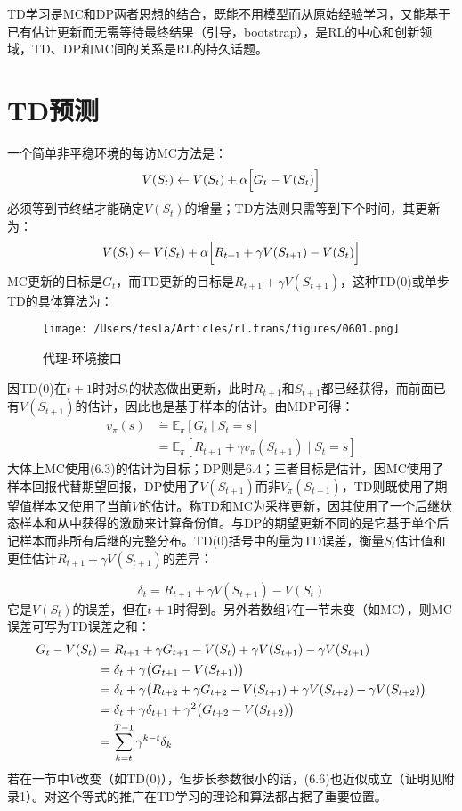 \documentclass{ctexart}
\begin{document}
TD学习是MC和DP两者思想的结合，既能不用模型而从原始经验学习，又能基于已有估计更新而无需等待最终结果（引导，bootstrap），是RL的中心和创新领域，TD、DP和MC间的关系是RL的持久话题。


\section{TD预测}

一个简单非平稳环境的每访MC方法是：
\begin{equation}
V(S_t) \leftarrow V(S_t) + \alpha\Bigl[G_t-V(S_t)\Bigr]
\end{equation}
必须等到节终结才能确定$V(S_t)$的增量；TD方法则只需等到下个时间，其更新为：
\begin{equation}
V(S_t) \leftarrow V(S_t) + \alpha\Bigl[R_{t+1}+\gamma V(S_{t+1})-V(S_t)\Bigr]
\end{equation}
MC更新的目标是$G_t$，而TD更新的目标是$R_{t+1}+\gamma V(S_{t+1})$，这种TD(0)或单步TD的具体算法为：

\begin{figure}[htbp]
    \centering
    \texttt{[image: /Users/tesla/Articles/rl.trans/figures/0601.png]}
    \caption{代理-环境接口}
    \label{fig:0601} 
\end{figure}

因TD(0)在$t+1$时对$S_{t}$的状态做出更新，此时$R_{t+1}$和$S_{t+1}$都已经获得，而前面已有$V(S_{t+1})$的估计，因此也是基于样本的估计。由MDP可得：
\begin{align}
v_\pi(s) &\dot= \mathbb E_\pi[G_t\mid S_t=s] \\
&= \mathbb E_\pi[R_{t+1}+\gamma v_\pi(S_{t+1}) \mid S_t=s]
\end{align}
大体上MC使用(6.3)的估计为目标；DP则是6.4；三者目标是估计，因MC使用了样本回报代替期望回报，DP使用了$V(S_{t+1})$而非$V_\pi(S_{t+1})$，TD则既使用了期望值样本又使用了当前$V$的估计。称TD和MC为采样更新，因其使用了一个后继状态样本和从中获得的激励来计算备份值。与DP的期望更新不同的是它基于单个后记样本而非所有后继的完整分布。TD(0)括号中的量为TD误差，衡量$S_t$估计值和更佳估计$R_{t+1}+\gamma V(S_{t+1})$的差异：

\begin{equation}
\delta_t = R_{t+1} + \gamma V(S_{t+1}) - V(S_t)
\end{equation}
它是$V(S_t)$的误差，但在$t+1$时得到。另外若数组$V$在一节未变（如MC），则MC误差可写为TD误差之和：
\begin{align}
G_t - V(S_t) &= R_{t+1} + \gamma G_{t+1} - V(S_t) +\gamma V(S_{t+1}) - \gamma V(S_{t+1})\notag\\
&= \delta_{t} +\gamma \bigl( G_{t+1}-V(S_{t+1}) \bigr)\notag\\
&= \delta_t + \gamma\bigl( R_{t+2}+\gamma G_{t+2} - V(S_{t+1})+\gamma V(S_{t+2}) -\gamma V(S_{t+2}) \bigr)\notag\\
&= \delta_t + \gamma\delta_{t+1} + \gamma^2\bigl( G_{t+2}-V(S_{t+2}) \bigr)\notag\\
&= \sum_{k=t}^{T-1}\gamma^{k-t}\delta_k
\end{align}
若在一节中$V$改变（如TD(0)），但步长参数很小的话，(6.6)也近似成立（证明见附录1）。对这个等式的推广在TD学习的理论和算法都占据了重要位置。
\end{document}
